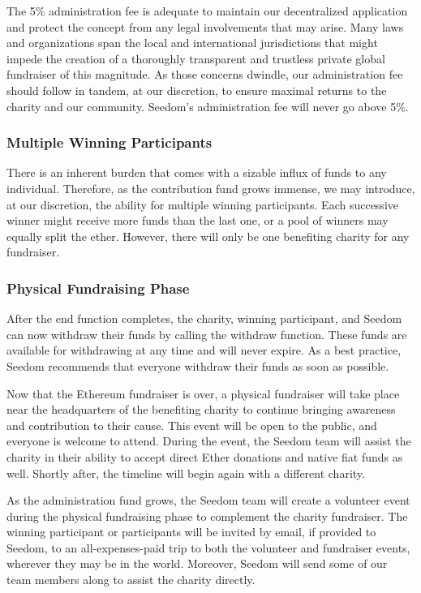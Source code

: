 \documentclass[11pt]{article}
\begin{document}
The 5\% administration fee is adequate to maintain our decentralized application and protect the concept from any legal involvements that may arise. Many laws and organizations span the local and international jurisdictions that might impede the creation of a thoroughly transparent and trustless private global fundraiser of this magnitude. As those concerns dwindle, our administration fee should follow in tandem, at our discretion, to ensure maximal returns to the charity and our community. Seedom's administration fee will never go above 5\%.

\subsubsection{Multiple Winning Participants}

There is an inherent burden that comes with a sizable influx of funds to any individual. Therefore, as the contribution fund grows immense, we may introduce, at our discretion, the ability for multiple winning participants. Each successive winner might receive more funds than the last one, or a pool of winners may equally split the ether. However, there will only be one benefiting charity for any fundraiser.

\subsubsection{Physical Fundraising Phase}

After the end function completes, the charity, winning participant, and Seedom can now withdraw their funds by calling the withdraw function. These funds are available for withdrawing at any time and will never expire. As a best practice, Seedom recommends that everyone withdraw their funds as soon as possible.

Now that the Ethereum fundraiser is over, a physical fundraiser will take place near the headquarters of the benefiting charity to continue bringing awareness and contribution to their cause. This event will be open to the public, and everyone is welcome to attend. During the event, the Seedom team will assist the charity in their ability to accept direct Ether donations and native fiat funds as well. Shortly after, the timeline will begin again with a different charity.

As the administration fund grows, the Seedom team will create a volunteer event during the physical fundraising phase to complement the charity fundraiser. The winning participant or participants will be invited by email, if provided to Seedom, to an all-expenses-paid trip to both the volunteer and fundraiser events, wherever they may be in the world. Moreover, Seedom will send some of our team members along to assist the charity directly.
\end{document}
